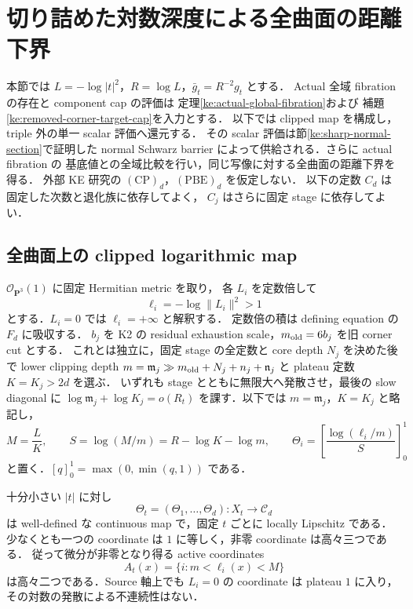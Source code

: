 \section{切り詰めた対数深度による全曲面の距離下界}
\label{ke:global-scalar-lower-section}

本節では $L=-\log|t|^2$，$R=\log L$，$\bar g_t=R^{-2}g_t$ とする．
Actual 全域 fibration の存在と component cap の評価は
定理\ref{ke:actual-global-fibration}および
補題\ref{ke:removed-corner-target-cap}を入力とする．
以下では clipped map を構成し，triple 外の単一 scalar 評価へ還元する．
その scalar 評価は節\ref{ke:sharp-normal-section}で証明した
normal Schwarz barrier によって供給される．さらに actual fibration の
基底値との全域比較を行い，同じ写像に対する全曲面の距離下界を得る．
外部 KE 研究の $\mathrm{(CP)}_d$，$\mathrm{(PBE)}_d$ を仮定しない．
以下の定数 $C_d$ は固定した次数と退化族に依存してよく，
$C_j$ はさらに固定 stage に依存してよい．

\subsection{全曲面上の clipped logarithmic map}

$\mathcal O_{\mathbf P^3}(1)$ に固定 Hermitian metric を取り，
各 $L_i$ を定数倍して
\[
 \ell_i=-\log\|L_i\|^2>1
\]
とする．$L_i=0$ では $\ell_i=+\infty$ と解釈する．
定数倍の積は defining equation の $F_d$ に吸収する．
$b_j$ を K2 の residual exhaustion scale，$m_{\rm old}=6b_j$ を旧 corner cut とする．
これとは独立に，固定 stage の全定数と core depth $N_j$ を決めた後で
lower clipping depth $m=\mathfrak m_j\gg m_{\rm old}+N_j+n_j+\mathfrak n_j$ と
plateau 定数 $K=K_j>2d$ を選ぶ．
いずれも stage とともに無限大へ発散させ，最後の slow diagonal に
$\log\mathfrak m_j+\log K_j=o(R_t)$ を課す．以下では $m=\mathfrak m_j$，$K=K_j$ と略記し，
\[
 M=\frac{L}{K},\qquad S=\log(M/m)=R-\log K-\log m,
 \qquad
 \Theta_i=\left[\frac{\log(\ell_i/m)}S\right]_0^1
\]
と置く．$[q]_0^1=\max(0,\min(q,1))$ である．

\begin{lemma}
\label{ke:global-clipped-depth-map}
十分小さい $|t|$ に対し
\[
 \Theta_t=(\Theta_1,\ldots,\Theta_d):X_t\longrightarrow\mathcal C_d
\]
は well-defined な continuous map で，固定 $t$ ごとに locally Lipschitz である．
少なくとも一つの coordinate は $1$ に等しく，非零 coordinate は高々三つである．
従って微分が非零となり得る active coordinates
\[
 A_t(x)=\{i:m<\ell_i(x)<M\}
\]
は高々二つである．Source 軸上でも $L_i=0$ の coordinate は plateau $1$ に入り，
その対数の発散による不連続性はない．
\end{lemma}

